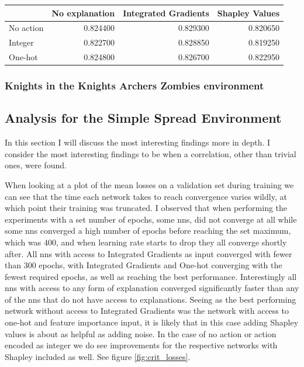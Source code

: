 \documentclass[UKenglish]{uiomasterthesis}
\begin{document}
\begin{center}
\label{tab:event_kaz}
\begin{tabular}{lrrr}
\toprule
 & No explanation & Integrated Gradients & Shapley Values \\
\midrule
No action & 0.824400 & 0.829300 & 0.820650 \\
Integer & 0.822700 & 0.828850 & 0.819250 \\
One-hot & 0.824800 & 0.826700 & 0.822950 \\
\bottomrule
\end{tabular}
\end{center}

\subsubsection{Knights in the Knights Archers Zombies environment}



\subsection{Analysis for the Simple Spread Environment}
In this section I will discuss the most interesting findings more in depth. I consider the most interesting findings to be when a correlation, other than trivial ones, were found.

When looking at a plot of the mean losses on a validation set during training we can see that the time each network takes to reach convergence varies wildly, at which point their training was truncated. I observed that when performing the experiments with a set number of epochs, some \acp{nn}, did not converge at all while some \acp{nn} converged a high number of epochs before reaching the set maximum, which was 400, and when learning rate starts to drop they all converge shortly after. All \acp{nn} with access to Integrated Gradients as input converged with fewer than 300 epochs, with Integrated Gradients and One-hot converging with the fewest required epochs, as well as reaching the best performance. Interestingly all \acp{nn} with access to any form of explanation converged significantly faster than any of the \acp{nn} that do not have access to explanations. Seeing as the best performing network without access to Integrated Gradients was the network with access to one-hot and feature importance input, it is likely that in this case adding Shapley values is about as helpful as adding noise. In the case of no action or action encoded as integer we do see improvements for the respective networks with Shapley included as well. See figure \ref{fig:crit_losses}.
\end{document}
